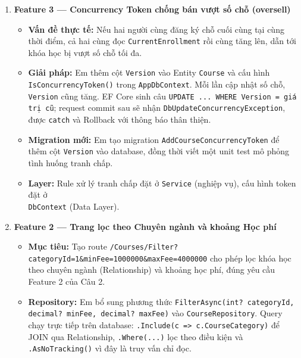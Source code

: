 \begin{enumerate}[label = \textbf{\arabic*.}, leftmargin = 0.5cm]
\begin{itemize}[label = $\bullet$, leftmargin = 0.3cm]
            \item \textbf{Layer:} Cấu hình được đặt ở tầng khởi tạo (\texttt{Program.cs}) và Options class, đúng tinh thần Options Pattern ở mức production.
        \end{itemize}

    \item \textbf{Feature 3 --- Concurrency Token chống bán vượt số chỗ (oversell)}
        \begin{itemize}[label = $\bullet$, leftmargin = 0.3cm]
            \item \textbf{Vấn đề thực tế:} Nếu hai người cùng đăng ký chỗ cuối cùng tại cùng thời điểm, cả hai cùng đọc \texttt{CurrentEnrollment} rồi cùng tăng lên, dẫn tới khóa học bị vượt số chỗ tối đa.

            \item \textbf{Giải pháp:} Em thêm cột \texttt{Version} vào Entity \texttt{Course} và cấu hình \\ \texttt{IsConcurrencyToken()} trong \texttt{AppDbContext}. Mỗi lần cập nhật số chỗ, \texttt{Version} cũng tăng. EF Core sinh câu \texttt{UPDATE ... WHERE Version = giá trị cũ}; request commit sau sẽ nhận \texttt{DbUpdateConcurrencyException}, được \texttt{catch} và Rollback với thông báo thân thiện.

            \item \textbf{Migration mới:} Em tạo migration \texttt{AddCourseConcurrencyToken} để thêm cột \texttt{Version} vào database, đồng thời viết một unit test mô phỏng tình huống tranh chấp.

            \item \textbf{Layer:} Rule xử lý tranh chấp đặt ở \texttt{Service} (nghiệp vụ), cấu hình token đặt ở \\ \texttt{DbContext} (Data Layer).
        \end{itemize}

    \item \textbf{Feature 2 --- Trang lọc theo Chuyên ngành và khoảng Học phí}
        \begin{itemize}[label = $\bullet$, leftmargin = 0.3cm]
            \item \textbf{Mục tiêu:} Tạo route \texttt{/Courses/Filter?categoryId=1\&minFee=1000000\&maxFee=4000000} cho phép lọc khóa học theo chuyên ngành (Relationship) và khoảng học phí, đúng yêu cầu Feature 2 của Câu 2.

            \item \textbf{Repository:} Em bổ sung phương thức \texttt{FilterAsync(int? categoryId, decimal? minFee, decimal? maxFee)} vào \texttt{CourseRepository}. Query chạy trực tiếp trên database: \texttt{.Include(c => c.CourseCategory)} để JOIN qua Relationship, \texttt{.Where(...)} lọc theo điều kiện và \texttt{.AsNoTracking()} vì đây là truy vấn chỉ đọc.


\end{itemize}
\end{enumerate}

